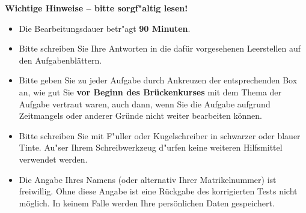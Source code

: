 \documentclass[12pt,answers]{exam}
\begin{document}
\begin{center} \textbf{Wichtige Hinweise -- bitte sorgf"altig lesen!} \end{center}
\begin{itemize}
\item Die Bearbeitungsdauer betr"agt \textbf{90 Minuten}.

\item Bitte schreiben Sie Ihre Antworten in die daf\"ur vorgesehenen
Leerstellen auf den Aufgabenbl\"attern.

\item Bitte geben Sie zu jeder Aufgabe durch Ankreuzen der entsprechenden
Box an, wie gut Sie \textbf{vor Beginn des Brückenkurses}
mit dem Thema der Aufgabe vertraut waren, auch dann,
wenn Sie die Aufgabe aufgrund Zeitmangels oder anderer Gründe
nicht weiter bearbeiten können.

\item Bitte schreiben Sie mit F"uller oder Kugelschreiber in schwarzer oder
blauer Tinte. Au"ser Ihrem Schreibwerkzeug 
d"urfen keine weiteren Hilfsmittel verwendet werden.

\item Die Angabe Ihres Namens (oder alternativ Ihrer Matrikelnummer) ist
freiwillig. Ohne diese Angabe ist eine Rückgabe des korrigierten Tests
nicht möglich. In keinem Falle werden Ihre persönlichen Daten gespeichert.

\end{itemize}

\clearpage
\end{document}

